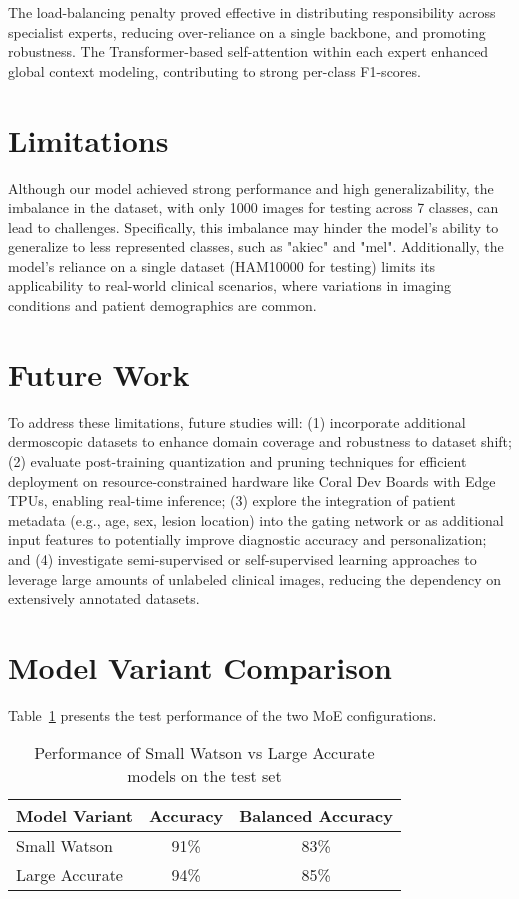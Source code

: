 \begin{itemize}
The load-balancing penalty proved effective in distributing responsibility across specialist experts, reducing over-reliance on a single backbone, and promoting robustness. The Transformer-based self-attention within each expert enhanced global context modeling, contributing to strong per-class F1-scores.

\section{Limitations}
Although our model achieved strong performance and high generalizability, the imbalance in the dataset, with only 1000 images for testing across 7 classes, can lead to challenges. Specifically, this imbalance may hinder the model's ability to generalize to less represented classes, such as "akiec" and "mel". Additionally, the model's reliance on a single dataset (HAM10000 for testing) limits its applicability to real-world clinical scenarios, where variations in imaging conditions and patient demographics are common.    

\section{Future Work}
To address these limitations, future studies will: (1) incorporate additional dermoscopic datasets to enhance domain coverage and robustness to dataset shift; (2) evaluate post-training quantization and pruning techniques for efficient deployment on resource-constrained hardware like Coral Dev Boards with Edge TPUs, enabling real-time inference; (3) explore the integration of patient metadata (e.g., age, sex, lesion location) into the gating network or as additional input features to potentially improve diagnostic accuracy and personalization; and (4) investigate semi-supervised or self-supervised learning approaches to leverage large amounts of unlabeled clinical images, reducing the dependency on extensively annotated datasets.

\section{Model Variant Comparison}
Table~\ref{tab:model-comparison} presents the test performance of the two MoE configurations.
\begin{table}[h!]
  \centering
  \caption{Performance of Small Watson vs Large Accurate models on the test set}
  \label{tab:model-comparison}
  \begin{tabular}{lcc}
    \hline
    Model Variant   & Accuracy & Balanced Accuracy \\
    \hline
    Small Watson    & 91\%     & 83\% \\
    Large Accurate  & 94\%     & 85\% \\
    \hline
  \end{tabular}
\end{table}


\end{itemize}
